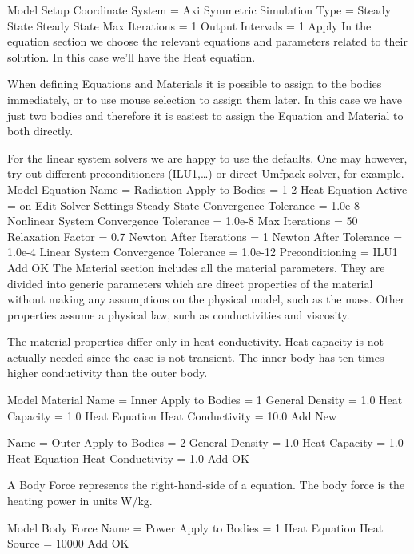 \ttbegin
Model
  Setup 
     Coordinate System = Axi Symmetric
     Simulation Type = Steady State
     Steady State Max Iterations = 1
     Output Intervals = 1
  Apply
\ttend
In the equation section we choose the relevant equations and parameters related to their solution. 
In this case we'll have the Heat equation.

When defining Equations and Materials it is possible to assign to the bodies 
immediately, or to use mouse selection to assign them later. In this case we 
have just two bodies and therefore it is easiest to assign the Equation and
Material to both directly.

For the linear system solvers we are happy to use the defaults. One may however, try out different
preconditioners (ILU1,\ldots) or direct Umfpack solver, for example.
\ttbegin
Model
  Equation
   Name = Radiation
    Apply to Bodies = 1 2
    Heat Equation
      Active = on
    Edit Solver Settings
       Steady State
         Convergence Tolerance = 1.0e-8
       Nonlinear System
        Convergence Tolerance = 1.0e-8
        Max Iterations = 50
        Relaxation Factor = 0.7
        Newton After Iterations = 1
        Newton After Tolerance = 1.0e-4
      Linear System
        Convergence Tolerance = 1.0e-12
        Preconditioning = ILU1
    Add 
    OK
\ttend        
The Material section includes all the material parameters. They are divided into 
generic parameters which are direct properties of the material without making 
any assumptions on the physical model, such as the mass. Other properties 
assume a physical law, such as conductivities and viscosity. 

The material properties differ only in heat conductivity. Heat capacity is not
actually needed since the case is not transient. The inner body has ten times
higher conductivity than the outer body.

\ttbegin
Model
  Material
    Name = Inner
    Apply to Bodies = 1 
    General 
      Density = 1.0
      Heat Capacity = 1.0
    Heat Equation
      Heat Conductivity = 10.0
    Add
    New

    Name = Outer
    Apply to Bodies = 2 
    General 
      Density = 1.0
      Heat Capacity = 1.0
    Heat Equation
      Heat Conductivity = 1.0
    Add
    OK
\ttend

A Body Force represents the right-hand-side of a equation. The body 
force is the heating power in units W/kg. 
 

\ttbegin
Model
  Body Force
    Name = Power
    Apply to Bodies = 1
    Heat Equation
       Heat Source = 10000
    Add 
    OK
\ttend    


